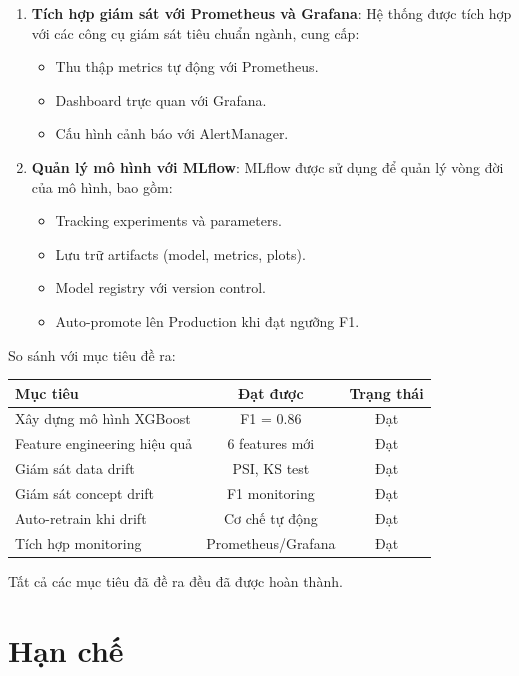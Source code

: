 \begin{enumerate}
    \item \textbf{Tích hợp giám sát với Prometheus và Grafana}: Hệ thống được tích hợp với các công cụ giám sát tiêu chuẩn ngành, cung cấp:
    \begin{itemize}
        \item Thu thập metrics tự động với Prometheus.
        \item Dashboard trực quan với Grafana.
        \item Cấu hình cảnh báo với AlertManager.
    \end{itemize}
    
    \item \textbf{Quản lý mô hình với MLflow}: MLflow được sử dụng để quản lý vòng đời của mô hình, bao gồm:
    \begin{itemize}
        \item Tracking experiments và parameters.
        \item Lưu trữ artifacts (model, metrics, plots).
        \item Model registry với version control.
        \item Auto-promote lên Production khi đạt ngưỡng F1.
    \end{itemize}
\end{enumerate}

So sánh với mục tiêu đề ra:

\begin{center}
\begin{tabular}{l|c|c}
    \textbf{Mục tiêu} & \textbf{Đạt được} & \textbf{Trạng thái} \\
    \hline
    Xây dựng mô hình XGBoost & F1 = 0.86 & Đạt \\
    Feature engineering hiệu quả & 6 features mới & Đạt \\
    Giám sát data drift & PSI, KS test & Đạt \\
    Giám sát concept drift & F1 monitoring & Đạt \\
    Auto-retrain khi drift & Cơ chế tự động & Đạt \\
    Tích hợp monitoring & Prometheus/Grafana & Đạt \\
\end{tabular}
\end{center}

Tất cả các mục tiêu đã đề ra đều đã được hoàn thành.

\section{Hạn chế}

